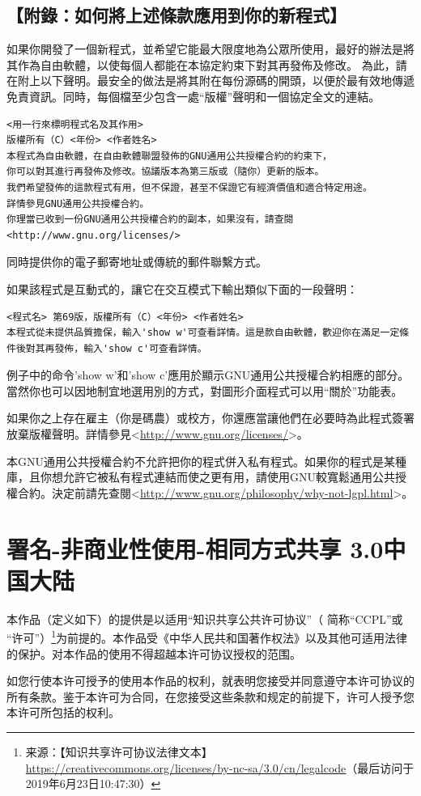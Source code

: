 \section{【附錄：如何將上述條款應用到你的新程式】}
如果你開發了一個新程式，並希望它能最大限度地為公眾所使用，最好的辦法是將其作為自由軟體，以使每個人都能在本協定約束下對其再發佈及修改。
為此，請在附上以下聲明。最安全的做法是將其附在每份源碼的開頭，以便於最有效地傳遞免責資訊。同時，每個檔至少包含一處“版權”聲明和一個協定全文的連結。
\begin{verbatim}
<用一行來標明程式名及其作用>
版權所有（C）<年份> <作者姓名>
本程式為自由軟體，在自由軟體聯盟發佈的GNU通用公共授權合約的約束下，
你可以對其進行再發佈及修改。協議版本為第三版或（隨你）更新的版本。
我們希望發佈的這款程式有用，但不保證，甚至不保證它有經濟價值和適合特定用途。
詳情參見GNU通用公共授權合約。
你理當已收到一份GNU通用公共授權合約的副本，如果沒有，請查閱<http://www.gnu.org/licenses/>
\end{verbatim}\par
同時提供你的電子郵寄地址或傳統的郵件聯繫方式。\par
如果該程式是互動式的，讓它在交互模式下輸出類似下面的一段聲明：
\begin{verbatim}
<程式名> 第69版，版權所有（C）<年份> <作者姓名>
本程式從未提供品質擔保，輸入'show w'可查看詳情。這是款自由軟體，歡迎你在滿足一定條件後對其再發佈，輸入'show c'可查看詳情。
\end{verbatim}\par
例子中的命令'show w'和'show c'應用於顯示GNU通用公共授權合約相應的部分。當然你也可以因地制宜地選用別的方式，對圖形介面程式可以用“關於”功能表。\par
如果你之上存在雇主（你是碼農）或校方，你還應當讓他們在必要時為此程式簽署放棄版權聲明。詳情參見<\url{http://www.gnu.org/licenses/}>。\par
本GNU通用公共授權合約不允許把你的程式併入私有程式。如果你的程式是某種庫，且你想允許它被私有程式連結而使之更有用，請使用GNU較寬鬆通用公共授權合約。決定前請先查閱<\url{http://www.gnu.org/philosophy/why-not-lgpl.html}>。 
\chapter{署名-非商业性使用-相同方式共享 3.0中国大陆}
本作品（定义如下）的提供是以适用“知识共享公共许可协议”（ 简称“CCPL”或 “许可”）\footnote{来源：【知识共享许可协议法律文本】\url{https://creativecommons.org/licenses/by-nc-sa/3.0/cn/legalcode}（最后访问于2019年6月23日10:47:30）}为前提的。本作品受《中华人民共和国著作权法》以及其他可适用法律的保护。对本作品的使用不得超越本许可协议授权的范围。\par
如您行使本许可授予的使用本作品的权利，就表明您接受并同意遵守本许可协议的所有条款。鉴于本许可为合同，在您接受这些条款和规定的前提下，许可人授予您本许可所包括的权利。
